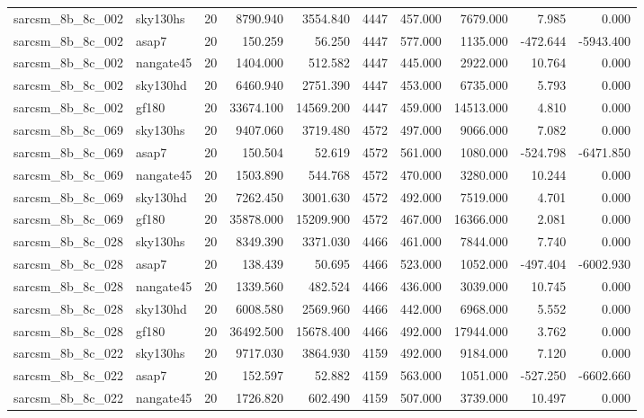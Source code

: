 \begin{longtable}{llrrrrrrrr}
sarcsm\_8b\_8c\_002 & sky130hs & 20 & 8790.940 & 3554.840 & 4447 & 457.000 & 7679.000 & 7.985 & 0.000 \\
sarcsm\_8b\_8c\_002 & asap7 & 20 & 150.259 & 56.250 & 4447 & 577.000 & 1135.000 & -472.644 & -5943.400 \\
sarcsm\_8b\_8c\_002 & nangate45 & 20 & 1404.000 & 512.582 & 4447 & 445.000 & 2922.000 & 10.764 & 0.000 \\
sarcsm\_8b\_8c\_002 & sky130hd & 20 & 6460.940 & 2751.390 & 4447 & 453.000 & 6735.000 & 5.793 & 0.000 \\
sarcsm\_8b\_8c\_002 & gf180 & 20 & 33674.100 & 14569.200 & 4447 & 459.000 & 14513.000 & 4.810 & 0.000 \\
sarcsm\_8b\_8c\_069 & sky130hs & 20 & 9407.060 & 3719.480 & 4572 & 497.000 & 9066.000 & 7.082 & 0.000 \\
sarcsm\_8b\_8c\_069 & asap7 & 20 & 150.504 & 52.619 & 4572 & 561.000 & 1080.000 & -524.798 & -6471.850 \\
sarcsm\_8b\_8c\_069 & nangate45 & 20 & 1503.890 & 544.768 & 4572 & 470.000 & 3280.000 & 10.244 & 0.000 \\
sarcsm\_8b\_8c\_069 & sky130hd & 20 & 7262.450 & 3001.630 & 4572 & 492.000 & 7519.000 & 4.701 & 0.000 \\
sarcsm\_8b\_8c\_069 & gf180 & 20 & 35878.000 & 15209.900 & 4572 & 467.000 & 16366.000 & 2.081 & 0.000 \\
sarcsm\_8b\_8c\_028 & sky130hs & 20 & 8349.390 & 3371.030 & 4466 & 461.000 & 7844.000 & 7.740 & 0.000 \\
sarcsm\_8b\_8c\_028 & asap7 & 20 & 138.439 & 50.695 & 4466 & 523.000 & 1052.000 & -497.404 & -6002.930 \\
sarcsm\_8b\_8c\_028 & nangate45 & 20 & 1339.560 & 482.524 & 4466 & 436.000 & 3039.000 & 10.745 & 0.000 \\
sarcsm\_8b\_8c\_028 & sky130hd & 20 & 6008.580 & 2569.960 & 4466 & 442.000 & 6968.000 & 5.552 & 0.000 \\
sarcsm\_8b\_8c\_028 & gf180 & 20 & 36492.500 & 15678.400 & 4466 & 492.000 & 17944.000 & 3.762 & 0.000 \\
sarcsm\_8b\_8c\_022 & sky130hs & 20 & 9717.030 & 3864.930 & 4159 & 492.000 & 9184.000 & 7.120 & 0.000 \\
sarcsm\_8b\_8c\_022 & asap7 & 20 & 152.597 & 52.882 & 4159 & 563.000 & 1051.000 & -527.250 & -6602.660 \\
sarcsm\_8b\_8c\_022 & nangate45 & 20 & 1726.820 & 602.490 & 4159 & 507.000 & 3739.000 & 10.497 & 0.000 \\

\end{longtable}
